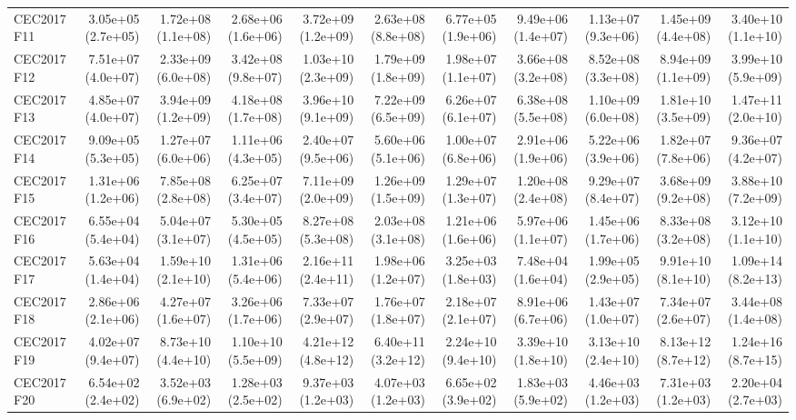 \begin{longtable}{lrrrrrrrrrr}
CEC2017 F11 & 3.05e+05 (2.7e+05) & 1.72e+08 (1.1e+08) & 2.68e+06 (1.6e+06) & 3.72e+09 (1.2e+09) & 2.63e+08 (8.8e+08) & 6.77e+05 (1.9e+06) & 9.49e+06 (1.4e+07) & 1.13e+07 (9.3e+06) & 1.45e+09 (4.4e+08) & 3.40e+10 (1.1e+10) \\
CEC2017 F12 & 7.51e+07 (4.0e+07) & 2.33e+09 (6.0e+08) & 3.42e+08 (9.8e+07) & 1.03e+10 (2.3e+09) & 1.79e+09 (1.8e+09) & 1.98e+07 (1.1e+07) & 3.66e+08 (3.2e+08) & 8.52e+08 (3.3e+08) & 8.94e+09 (1.1e+09) & 3.99e+10 (5.9e+09) \\
CEC2017 F13 & 4.85e+07 (4.0e+07) & 3.94e+09 (1.2e+09) & 4.18e+08 (1.7e+08) & 3.96e+10 (9.1e+09) & 7.22e+09 (6.5e+09) & 6.26e+07 (6.1e+07) & 6.38e+08 (5.5e+08) & 1.10e+09 (6.0e+08) & 1.81e+10 (3.5e+09) & 1.47e+11 (2.0e+10) \\
CEC2017 F14 & 9.09e+05 (5.3e+05) & 1.27e+07 (6.0e+06) & 1.11e+06 (4.3e+05) & 2.40e+07 (9.5e+06) & 5.60e+06 (5.1e+06) & 1.00e+07 (6.8e+06) & 2.91e+06 (1.9e+06) & 5.22e+06 (3.9e+06) & 1.82e+07 (7.8e+06) & 9.36e+07 (4.2e+07) \\
CEC2017 F15 & 1.31e+06 (1.2e+06) & 7.85e+08 (2.8e+08) & 6.25e+07 (3.4e+07) & 7.11e+09 (2.0e+09) & 1.26e+09 (1.5e+09) & 1.29e+07 (1.3e+07) & 1.20e+08 (2.4e+08) & 9.29e+07 (8.4e+07) & 3.68e+09 (9.2e+08) & 3.88e+10 (7.2e+09) \\
CEC2017 F16 & 6.55e+04 (5.4e+04) & 5.04e+07 (3.1e+07) & 5.30e+05 (4.5e+05) & 8.27e+08 (5.3e+08) & 2.03e+08 (3.1e+08) & 1.21e+06 (1.6e+06) & 5.97e+06 (1.1e+07) & 1.45e+06 (1.7e+06) & 8.33e+08 (3.2e+08) & 3.12e+10 (1.1e+10) \\
CEC2017 F17 & 5.63e+04 (1.4e+04) & 1.59e+10 (2.1e+10) & 1.31e+06 (5.4e+06) & 2.16e+11 (2.4e+11) & 1.98e+06 (1.2e+07) & 3.25e+03 (1.8e+03) & 7.48e+04 (1.6e+04) & 1.99e+05 (2.9e+05) & 9.91e+10 (8.1e+10) & 1.09e+14 (8.2e+13) \\
CEC2017 F18 & 2.86e+06 (2.1e+06) & 4.27e+07 (1.6e+07) & 3.26e+06 (1.7e+06) & 7.33e+07 (2.9e+07) & 1.76e+07 (1.8e+07) & 2.18e+07 (2.1e+07) & 8.91e+06 (6.7e+06) & 1.43e+07 (1.0e+07) & 7.34e+07 (2.6e+07) & 3.44e+08 (1.4e+08) \\
CEC2017 F19 & 4.02e+07 (9.4e+07) & 8.73e+10 (4.4e+10) & 1.10e+10 (5.5e+09) & 4.21e+12 (4.8e+12) & 6.40e+11 (3.2e+12) & 2.24e+10 (9.4e+10) & 3.39e+10 (1.8e+10) & 3.13e+10 (2.4e+10) & 8.13e+12 (8.7e+12) & 1.24e+16 (8.7e+15) \\
CEC2017 F20 & 6.54e+02 (2.4e+02) & 3.52e+03 (6.9e+02) & 1.28e+03 (2.5e+02) & 9.37e+03 (1.2e+03) & 4.07e+03 (1.2e+03) & 6.65e+02 (3.9e+02) & 1.83e+03 (5.9e+02) & 4.46e+03 (1.2e+03) & 7.31e+03 (1.2e+03) & 2.20e+04 (2.7e+03) \\

\end{longtable}

